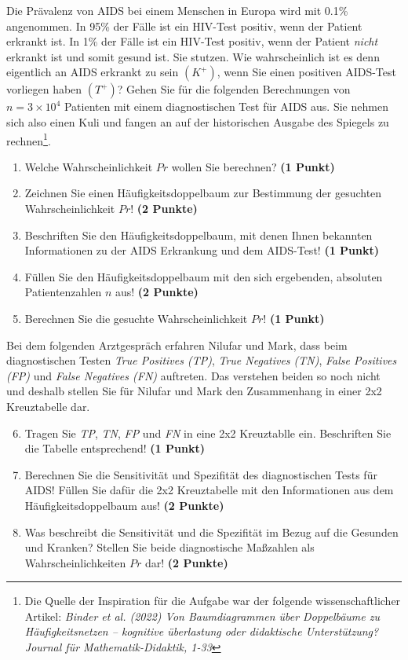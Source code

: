 \documentclass[a4paper, 9pt]{scrartcl}\usepackage[]{graphicx}\usepackage[]{xcolor}
\begin{document}
Die Prävalenz von AIDS bei einem Menschen in Europa wird mit 0.1\% angenommen. In 95\% der Fälle ist ein HIV-Test positiv, wenn der Patient erkrankt ist. In 1\% der Fälle ist ein HIV-Test positiv, wenn der Patient \textit{nicht} erkrankt ist und somit gesund ist. Sie stutzen. Wie wahrscheinlich ist es denn eigentlich an AIDS erkrankt zu sein $(K^+)$, wenn Sie einen positiven AIDS-Test vorliegen haben $(T^+)$? Gehen Sie für die folgenden Berechnungen von $n = \ensuremath{3\times 10^{4}}$ Patienten mit einem diagnostischen Test für AIDS aus. Sie nehmen sich also einen Kuli und fangen an auf der historischen Ausgabe des Spiegels zu rechnen\footnote{Die Quelle der Inspiration für die Aufgabe war der folgende wissenschaftlicher Artikel: \textit{Binder et al. (2022) Von Baumdiagrammen über Doppelbäume zu Häufigkeitsnetzen -- kognitive überlastung oder didaktische Unterstützung? Journal für Mathematik-Didaktik, 1-33}}.


\begin{enumerate}
\item Welche Wahrscheinlichkeit $Pr$ wollen Sie berechnen? \textbf{(1 Punkt)}
\item Zeichnen Sie einen Häufigkeitsdoppelbaum zur Bestimmung der gesuchten Wahrscheinlichkeit $Pr$! \textbf{(2 Punkte)} \item Beschriften Sie den Häufigkeitsdoppelbaum, mit denen Ihnen bekannten Informationen zu der AIDS Erkrankung und dem AIDS-Test! \textbf{(1 Punkt)}
\item Füllen Sie den Häufigkeitsdoppelbaum mit den sich ergebenden, absoluten Patientenzahlen $n$ aus! \textbf{(2 Punkte)}
\item Berechnen Sie die gesuchte Wahrscheinlichkeit $Pr$! \textbf{(1 Punkt)}
\end{enumerate}

Bei dem folgenden Arztgespräch erfahren Nilufar und Mark, dass beim diagnostischen Testen \textit{True Positives (TP)}, \textit{True Negatives (TN)}, \textit{False Positives (FP)} und \textit{False Negatives (FN)} auftreten. Das verstehen beiden so noch nicht und deshalb stellen Sie für Nilufar und Mark den Zusammenhang in einer 2x2 Kreuztabelle dar.

\begin{enumerate}
  \setcounter{enumi}{5}
\item Tragen Sie \textit{TP}, \textit{TN}, \textit{FP} und \textit{FN} in eine 2x2 Kreuztablle ein. Beschriften Sie die Tabelle entsprechend! \textbf{(1 Punkt)}
\item Berechnen Sie die Sensitivität und Spezifität des diagnostischen Tests für AIDS! Füllen Sie dafür die 2x2 Kreuztabelle mit den Informationen aus dem Häufigkeitsdoppelbaum aus! \textbf{(2 Punkte)}
\item Was beschreibt die Sensitivität und die Spezifität im Bezug auf die Gesunden und Kranken? Stellen Sie beide diagnostische Maßzahlen als Wahrscheinlichkeiten $Pr$ dar! \textbf{(2 Punkte)} 
\end{enumerate}
\end{document}
